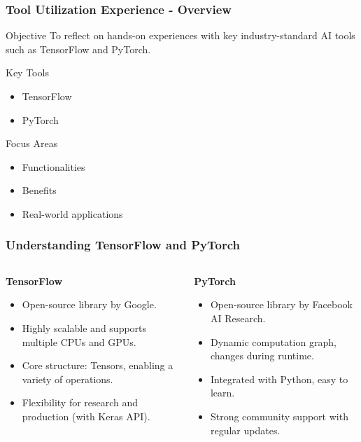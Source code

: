 \documentclass[aspectratio=169]{beamer}
\begin{document}
\begin{frame}[fragile]
    \frametitle{Tool Utilization Experience - Overview}
    \begin{block}{Objective}
        To reflect on hands-on experiences with key industry-standard AI tools such as TensorFlow and PyTorch.
    \end{block}
    \begin{block}{Key Tools}
        \begin{itemize}
            \item TensorFlow
            \item PyTorch
        \end{itemize}
    \end{block}
    \begin{block}{Focus Areas}
        \begin{itemize}
            \item Functionalities
            \item Benefits
            \item Real-world applications
        \end{itemize}
    \end{block}
\end{frame}

\begin{frame}[fragile]
    \frametitle{Understanding TensorFlow and PyTorch}
    \begin{columns}
        \begin{column}{0.5\textwidth}
            \textbf{TensorFlow}
            \begin{itemize}
                \item Open-source library by Google.
                \item Highly scalable and supports multiple CPUs and GPUs.
                \item Core structure: Tensors, enabling a variety of operations.
                \item Flexibility for research and production (with Keras API).
            \end{itemize}
        \end{column}

        \begin{column}{0.5\textwidth}
            \textbf{PyTorch}
            \begin{itemize}
                \item Open-source library by Facebook AI Research.
                \item Dynamic computation graph, changes during runtime.
                \item Integrated with Python, easy to learn.
                \item Strong community support with regular updates.
            \end{itemize}
        \end{column}
    \end{columns}
\end{frame}
\end{document}
